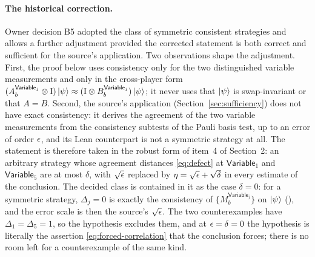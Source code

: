 \documentclass[11pt]{article}
\newcommand{\Id}{\mathrm{I}}
\newcommand{\Variable}{\mathsf{Variable}}
\begin{document}
\paragraph{The historical correction.}
Owner decision B5 adopted the class of symmetric consistent strategies and
allows a further adjustment provided the corrected statement is both correct
and sufficient for the source's application.  Two observations shape the
adjustment.  First, the proof below uses consistency only for the two
distinguished variable measurements and only in the cross-player form
$(A^{\Variable_j}_b \ot \Id)\ket\psi \approx (\Id \ot B^{\Variable_j}_b)\ket\psi$;
it never uses that $\ket\psi$ is swap-invariant or that $A = B$.  Second, the
source's application (Section~\ref{sec:sufficiency}) does not have exact
consistency: it derives the agreement of the two variable measurements from
the consistency subtests of the Pauli basis test, up to an error of order
$\epsilon$, and its Lean counterpart is not a symmetric strategy at all.  The
statement is therefore taken in the robust form of item~4 of Section~2: an
arbitrary strategy whose agreement distances \eqref{eq:defect} at
$\Variable_1$ and $\Variable_5$ are at most $\delta$, with $\sqrt{\epsilon}$
replaced by
$\eta = \sqrt{\epsilon} + \sqrt\delta$ in every estimate of the conclusion.  The
decided class is contained in it as the case $\delta = 0$: for a symmetric
strategy, $\Delta_j = 0$ is exactly the consistency of $\{M^{\Variable_j}_b\}$
on $\ket\psi$ (),
and the error scale is then the source's $\sqrt{\epsilon}$. The two
counterexamples have $\Delta_1 = \Delta_5 = 1$, so the hypothesis excludes
them, and at $\epsilon = \delta = 0$ the hypothesis is literally the assertion
\eqref{eq:forced-correlation} that the conclusion forces; there is no room
left for a counterexample of the same kind.
\end{document}
